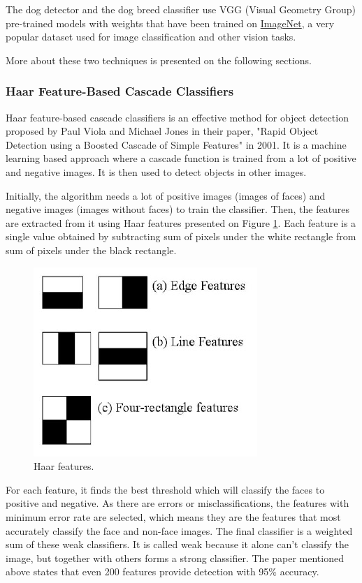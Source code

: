 \documentclass{article}
\begin{document}
    The dog detector and the dog breed classifier use VGG (Visual Geometry Group) pre-trained models with weights that have been trained on \href{https://image-net.org/}{ImageNet}, a very popular dataset used for image classification and other vision tasks.

    More about these two techniques is presented on the following sections.
    
    \subsubsection{Haar Feature-Based Cascade Classifiers}

    Haar feature-based cascade classifiers is an effective method for object detection proposed by Paul Viola and Michael Jones in their paper, "Rapid Object Detection using a Boosted Cascade of Simple Features" in 2001. It is a machine learning based approach where a cascade function is trained from a lot of positive and negative images. It is then used to detect objects in other images.

    Initially, the algorithm needs a lot of positive images (images of faces) and negative images (images without faces) to train the classifier. Then, the features are extracted from it using Haar features presented on Figure \ref{fig:haar_features}. Each feature is a single value obtained by subtracting sum of pixels under the white rectangle from sum of pixels under the black rectangle.

    \begin{figure}[htbp]
        \centering
        \includegraphics[width=.4\linewidth]{img/haar_features.jpg}
        \caption{Haar features.}
        \label{fig:haar_features}
    \end{figure}

    For each feature, it finds the best threshold which will classify the faces to positive and negative. As there are errors or misclassifications, the features with minimum error rate are selected, which means they are the features that most accurately classify the face and non-face images. The final classifier is a weighted sum of these weak classifiers. It is called weak because it alone can't classify the image, but together with others forms a strong classifier. The paper mentioned above states that even 200 features provide detection with 95\% accuracy.
\end{document}
